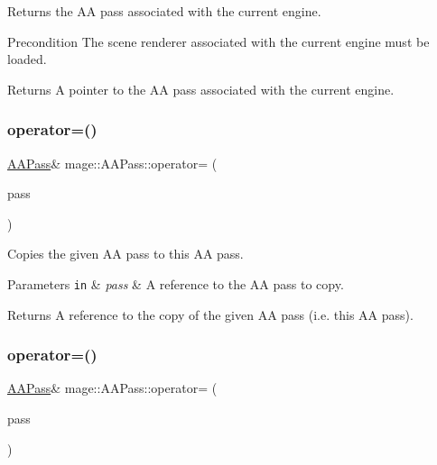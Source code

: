 Returns the AA pass associated with the current engine.

\begin{DoxyPrecond}{Precondition}
The scene renderer associated with the current engine must be loaded. 
\end{DoxyPrecond}
\begin{DoxyReturn}{Returns}
A pointer to the AA pass associated with the current engine. 
\end{DoxyReturn}
\hypertarget{classmage_1_1_a_a_pass_a7462e2075a48698258c3e0758051b692}{}\label{classmage_1_1_a_a_pass_a7462e2075a48698258c3e0758051b692} 
\subsubsection{\texorpdfstring{operator=()}{operator=()}\hspace{0.1cm}{\footnotesize\ttfamily [1/2]}}
{\footnotesize\ttfamily \hyperlink{classmage_1_1_a_a_pass}{A\+A\+Pass}\& mage\+::\+A\+A\+Pass\+::operator= (\begin{DoxyParamCaption}\item[{const \hyperlink{classmage_1_1_a_a_pass}{A\+A\+Pass} \&}]{pass }\end{DoxyParamCaption})\hspace{0.3cm}{\ttfamily [delete]}}

Copies the given AA pass to this AA pass.


\begin{DoxyParams}[1]{Parameters}
\mbox{\tt in}  & {\em pass} & A reference to the AA pass to copy. \\
\hline
\end{DoxyParams}
\begin{DoxyReturn}{Returns}
A reference to the copy of the given AA pass (i.\+e. this AA pass). 
\end{DoxyReturn}
\hypertarget{classmage_1_1_a_a_pass_a965b55e550f0214ae4a7772d064fd46e}{}\label{classmage_1_1_a_a_pass_a965b55e550f0214ae4a7772d064fd46e} 
\subsubsection{\texorpdfstring{operator=()}{operator=()}\hspace{0.1cm}{\footnotesize\ttfamily [2/2]}}
{\footnotesize\ttfamily \hyperlink{classmage_1_1_a_a_pass}{A\+A\+Pass}\& mage\+::\+A\+A\+Pass\+::operator= (\begin{DoxyParamCaption}\item[{\hyperlink{classmage_1_1_a_a_pass}{A\+A\+Pass} \&\&}]{pass }\end{DoxyParamCaption})\hspace{0.3cm}{\ttfamily [delete]}}

